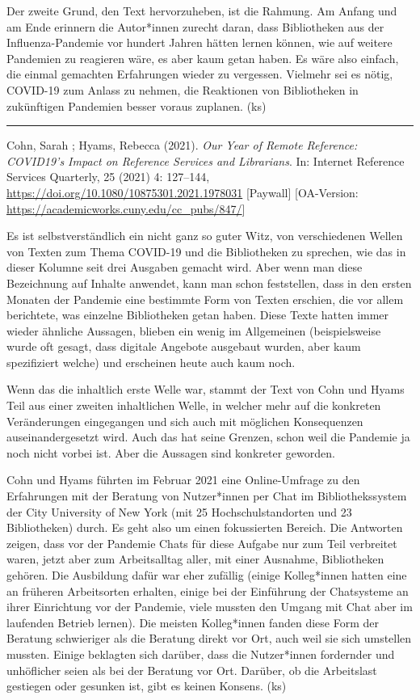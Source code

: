 \documentclass[a4paper,
fontsize=11pt,
oneside,
numbers=noperiodatend,
parskip=half-,
bibliography=totoc,
final
]{scrartcl}
\begin{document}
Der zweite Grund, den Text hervorzuheben, ist die Rahmung. Am Anfang und
am Ende erinnern die Autor*innen zurecht daran, dass Bibliotheken aus
der Influenza-Pandemie vor hundert Jahren hätten lernen können, wie auf
weitere Pandemien zu reagieren wäre, es aber kaum getan haben. Es wäre
also einfach, die einmal gemachten Erfahrungen wieder zu vergessen.
Vielmehr sei es nötig, COVID-19 zum Anlass zu nehmen, die Reaktionen von
Bibliotheken in zukünftigen Pandemien besser voraus zuplanen. (ks)

\begin{center}\rule{0.5\linewidth}{0.5pt}\end{center}

Cohn, Sarah ; Hyams, Rebecca (2021). \emph{Our Year of Remote Reference:
COVID19's Impact on Reference Services and Librarians}. In: Internet
Reference Services Quarterly, \hspace{0pt}\hspace{0pt}25 (2021) 4:
127--144, \url{https://doi.org/10.1080/10875301.2021.1978031}
{[}Paywall{]} {[}OA-Version:
\url{https://academicworks.cuny.edu/cc_pubs/847/}{]}

Es ist selbstverständlich ein nicht ganz so guter Witz, von
verschiedenen Wellen von Texten zum Thema COVID-19 und die Bibliotheken
zu sprechen, wie das in dieser Kolumne seit drei Ausgaben gemacht wird.
Aber wenn man diese Bezeichnung auf Inhalte anwendet, kann man schon
feststellen, dass in den ersten Monaten der Pandemie eine bestimmte Form
von Texten erschien, die vor allem berichtete, was einzelne Bibliotheken
getan haben. Diese Texte hatten immer wieder ähnliche Aussagen, blieben
ein wenig im Allgemeinen (beispielsweise wurde oft gesagt, dass digitale
Angebote ausgebaut wurden, aber kaum spezifiziert welche) und erscheinen
heute auch kaum noch.

Wenn das die inhaltlich erste Welle war, stammt der Text von Cohn und
Hyams Teil aus einer zweiten inhaltlichen Welle, in welcher mehr auf die
konkreten Veränderungen eingegangen und sich auch mit möglichen
Konsequenzen auseinandergesetzt wird. Auch das hat seine Grenzen, schon
weil die Pandemie ja noch nicht vorbei ist. Aber die Aussagen sind
konkreter geworden.

Cohn und Hyams führten im Februar 2021 eine Online-Umfrage zu den
Erfahrungen mit der Beratung von Nutzer*innen per Chat im
Bibliothekssystem der City University of New York (mit 25
Hochschulstandorten und 23 Bibliotheken) durch. Es geht also um einen
fokussierten Bereich. Die Antworten zeigen, dass vor der Pandemie Chats
für diese Aufgabe nur zum Teil verbreitet waren, jetzt aber zum
Arbeitsalltag aller, mit einer Ausnahme, Bibliotheken gehören. Die
Ausbildung dafür war eher zufällig (einige Kolleg*innen hatten eine an
früheren Arbeitsorten erhalten, einige bei der Einführung der
Chatsysteme an ihrer Einrichtung vor der Pandemie, viele mussten den
Umgang mit Chat aber im laufenden Betrieb lernen). Die meisten
Kolleg*innen fanden diese Form der Beratung schwieriger als die Beratung
direkt vor Ort, auch weil sie sich umstellen mussten. Einige beklagten
sich darüber, dass die Nutzer*innen fordernder und unhöflicher seien als
bei der Beratung vor Ort. Darüber, ob die Arbeitslast gestiegen oder
gesunken ist, gibt es keinen Konsens. (ks)
\end{document}
